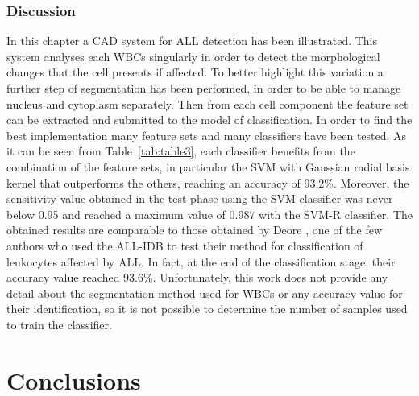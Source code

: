 \documentclass[final,a4paper,12pt,english]{UnicaPhdThesis3}
\begin{document}
	\section{Discussion}
	In this chapter a CAD system for ALL detection has been illustrated. This system analyses each WBCs singularly in order to detect the morphological changes that the cell presents if affected. To better highlight this variation a further step of segmentation has been performed, in order to be able to manage nucleus and cytoplasm separately. Then from each cell component the feature set can be extracted and submitted to the model of classification. In order to find the best implementation many feature sets and many classifiers have been tested. As it can be seen from Table~\ref{tab:table3}, each classifier benefits from the combination of the feature sets, in particular the SVM with Gaussian radial basis kernel that outperforms the others, reaching an accuracy of 93.2\%. Moreover, the sensitivity value obtained  in the test  phase using the SVM classifier was never below 0.95 and reached a maximum  value of 0.987 with the SVM-R classifier. The obtained results are comparable to those obtained by Deore \cite{Deore}, one of the few authors who used the ALL-IDB to test their method for classification of leukocytes affected by ALL. In fact, at  the end of the classification stage, their accuracy value reached 93.6\%. Unfortunately, this work does not provide any detail about the segmentation  method used for WBCs or any accuracy  value for their  identification,  so it is not possible to determine  the number of samples used to train the classifier.
	
	\part{Conclusions} 
\end{document}
